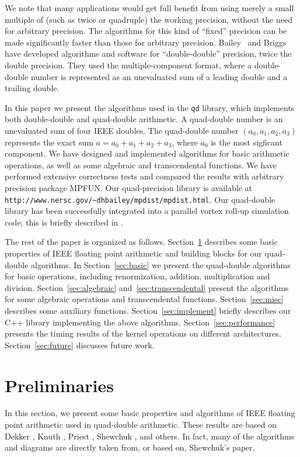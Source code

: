 \documentclass[11pt]{article}
\theoremstyle{definition}
\begin{document}
We note that many applications would get full benefit from using merely
a small multiple of (such as twice or quadruple) the working precision,
without the need for arbitrary precision.
The algorithms for this kind of ``fixed'' precision can be made
significantly faster than those for arbitrary precision.
Bailey~\cite{bai-dd} and Briggs~\cite{kbriggs97} have developed
algorithms and software for ``double-double'' precision, twice the 
double precision. They used the multiple-component format, where a 
double-double number is represented as an unevaluated
sum of a leading double and a trailing double.

In this paper we present the algorithms used in the {\tt qd} library, 
which implements both double-double and quad-double arithmetic.
A quad-double number is an unevaluated sum of four IEEE doubles.
The quad-double number $(a_0, a_1, a_2, a_3)$ represents the exact
sum $a = a_0 + a_1 + a_2 + a_3$, where $a_0$ is the most sigficant component.
We have designed and implemented algorithms for basic arithmetic
operations, as well as some algebraic and transcendental functions.
We have performed extensive correctness tests and compared the results 
with arbitrary precision package MPFUN.
Our quad-precision library is available at
{\tt http://www.nersc.gov/\~{ }dhbailey/mpdist/mpdist.html}.
Our quad-double library has been successfully integrated into a parallel 
vortex roll-up simulation code; this is briefly described in
\cite{hida00}.  

The rest of the paper is organized as follows.
Section~\ref{sec:prelim} describes some basic properties of IEEE
floating point arithmetic and building blocks for our quad-double
algorithms. In Section~\ref{sec:basic} we present the quad-double
algorithms for basic operations, including renormization, addition,
multiplication and division.
Section~\ref{sec:algebraic} and~\ref{sec:transcendental}
present the algorithms for some algebraic operations and transcendental
functions. Section~\ref{sec:misc} describes some auxiliary functions.
Section~\ref{sec:implement} briefly describes our C++ library 
implementing the above algorithms.
Section~\ref{sec:performance} presents the timing results of the
kernel operations on different architectures.
Section~\ref{sec:future} discusses future work.

\section{Preliminaries} \label{sec:prelim}
In this section, we present some basic properties and algorithms of IEEE 
floating point arithmetic used in quad-double arithmetic.
These results are based on Dekker \cite{dek71}, Knuth \cite{knu81}, 
Priest \cite{pri92}, Shewchuk \cite{she97}, and others.  In fact, 
many of the algorithms and diagrams are directly taken from, or based on, 
Shewchuk's paper.
\end{document}
